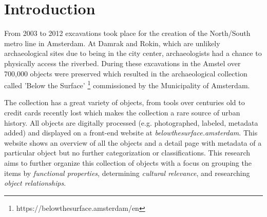 \section{Introduction}

From 2003 to 2012 excavations took place for the creation of the North/South metro line in Amsterdam. At Damrak and Rokin, which are unlikely archaeological sites due to being in the city center, archaeologists had a chance to physically access the riverbed. During these excavations in the Amstel over 700,000 objects were preserved which resulted in the archaeological collection called 'Below the Surface' \footnote{https://belowthesurface.amsterdam/en} commissioned by the Municipality of Amsterdam. 

The collection has a great variety of objects, from tools over centuries old to credit cards recently lost which makes the collection a rare source of urban history. All objects are digitally processed (e.g. photographed, labeled, metadata added) and displayed on a front-end website at \textit{belowthesurface.amsterdam}. This website shows an overview of all the objects and a detail page with metadata of a particular object but no further categorization or classifications. This research aims to further organize this collection of objects with a focus on grouping the items by \textit{functional properties}, determining \textit{cultural relevance}, and researching \textit{object relationships}.